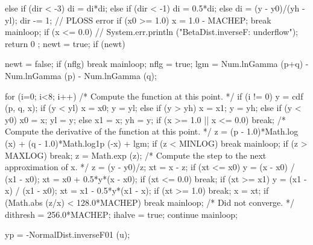 \begin{code}
\begin{hide}
{{{{{                  else if (dir < -3)
                     di = di*di;
                  else if (dir < -1)
                     di = 0.5*di;
                  else
                     di = (y - y0)/(yh - yl);
                  dir -= 1;
               }
            }
            // PLOSS error
            if (x0 >= 1.0) {
               x = 1.0 - MACHEP;
               break mainloop;
            }
            if (x <= 0.0) {
            // System.err.println ("BetaDist.inverseF: underflow");
               return 0 ;
            }
            newt = true;
         }
         if (newt) {
            newt = false;
            if (nflg)
               break mainloop;
            nflg = true;
            lgm = Num.lnGamma (p+q) - Num.lnGamma (p) - Num.lnGamma (q);

            for (i=0; i<8; i++) {
               /* Compute the function at this point. */
               if (i != 0)
                  y = cdf (p, q, x);
               if (y < yl) {
                  x = x0;
                  y = yl;
               }
               else if (y > yh) {
                  x = x1;
                  y = yh;
               }
               else if (y < y0) {
                  x0 = x;
                  yl = y;
               }
               else {
                  x1 = x;
                  yh = y;
               }
               if (x >= 1.0 || x <= 0.0)
                  break;
               /* Compute the derivative of the function at this point. */
               z = (p - 1.0)*Math.log (x) + (q - 1.0)*Math.log1p (-x) + lgm;
               if (z < MINLOG)
                  break mainloop;
               if (z > MAXLOG)
                  break;
               z = Math.exp (z);
               /* Compute the step to the next approximation of x. */
               z = (y - y0)/z;
               xt = x - z;
               if (xt <= x0) {
                  y = (x - x0) / (x1 - x0);
                  xt = x0 + 0.5*y*(x - x0);
                  if (xt <= 0.0)
                     break;
               }
               if (xt >= x1) {
                  y = (x1 - x) / (x1 - x0);
                  xt = x1 - 0.5*y*(x1 - x);
                  if (xt >= 1.0)
                     break;
               }
               x = xt;
               if (Math.abs (z/x) < 128.0*MACHEP)
                  break mainloop;
            }
            /* Did not converge.  */
            dithresh = 256.0*MACHEP;
            ihalve = true;
            continue mainloop;
         }

         yp = -NormalDist.inverseF01 (u);

}}
\end{hide}
\end{code}
